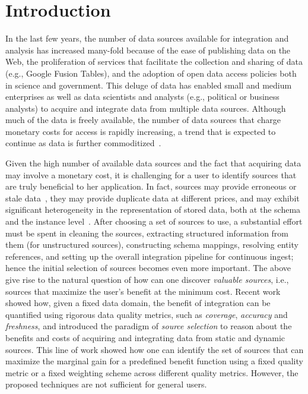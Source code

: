 \documentclass{sig-alternate}
\begin{document}
\section{Introduction}
In the last few years, the number of data sources available for integration and analysis has increased many-fold because of the ease of publishing data on the Web, the proliferation of services that facilitate the collection and sharing of data (e.g., Google Fusion Tables), and  the adoption of open data access policies both in science and government. This deluge of data has enabled small and medium enterprises as well as data scientists and analysts (e.g., political or business analysts) to acquire and integrate data from multiple data sources. Although much of the data is freely available, the number of data sources that charge monetary costs for access is rapidly increasing, a trend that is expected to continue as data is further commoditized~\cite{balazinska:vldb11}. 

Given the high number of available data sources and the fact that acquiring data may involve a monetary cost, it is challenging for a user to identify sources that are truly beneficial to her application. In fact, sources may provide erroneous or stale data~\cite{Dong_vldb:2009, li:2012}, they may provide duplicate data at different prices, and may exhibit significant heterogeneity in the representation of stored data, both at the schema and the instance level~\cite{bronzi:2013, li:2012, dassarma:2012}. After choosing a set of sources to use, a substantial effort must be spent in cleaning the sources, extracting structured information from them (for unstructured sources), constructing schema mappings, resolving entity references, and setting up the overall integration pipeline for continuous ingest; hence the initial selection of sources becomes even more important. The above give rise to the natural question of how can one discover {\em valuable sources}, i.e., sources that maximize the user's benefit at the minimum cost. Recent work~\cite{dong:vldb13,rekatsinas:2014} showed how, given a fixed data domain, the benefit of integration can be quantified using rigorous data quality metrics, such as {\em coverage}, {\em accuracy} and {\em freshness}, and introduced the paradigm of {\em source selection} to reason about the benefits and costs of acquiring and integrating data from static and dynamic sources. This line of work showed how one can identify the set of sources that can maximize the marginal gain for a predefined benefit function using a fixed quality metric or a fixed weighting scheme across different quality metrics. However, the proposed techniques are not sufficient for general users. 
\end{document}
